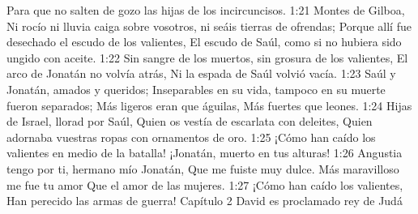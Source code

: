 Para que no salten de gozo las hijas de los incircuncisos.  
1:21 Montes de Gilboa,  
Ni rocío ni lluvia caiga sobre vosotros, ni seáis tierras de ofrendas;  
Porque allí fue desechado el escudo de los valientes,  
El escudo de Saúl, como si no hubiera sido ungido con aceite.  
1:22 Sin sangre de los muertos, sin grosura de los valientes,  
El arco de Jonatán no volvía atrás,  
Ni la espada de Saúl volvió vacía.  
1:23 Saúl y Jonatán, amados y queridos;  
Inseparables en su vida, tampoco en su muerte fueron separados;  
Más ligeros eran que águilas,  
Más fuertes que leones.  
1:24 Hijas de Israel, llorad por Saúl,  
Quien os vestía de escarlata con deleites,  
Quien adornaba vuestras ropas con ornamentos de oro.  
1:25 ¡Cómo han caído los valientes en medio de la batalla!  
¡Jonatán, muerto en tus alturas!  
1:26 Angustia tengo por ti, hermano mío Jonatán,  
Que me fuiste muy dulce.  
Más maravilloso me fue tu amor  
Que el amor de las mujeres.  
1:27 ¡Cómo han caído los valientes,  
Han perecido las armas de guerra!  
Capítulo 2 
David es proclamado rey de Judá  

